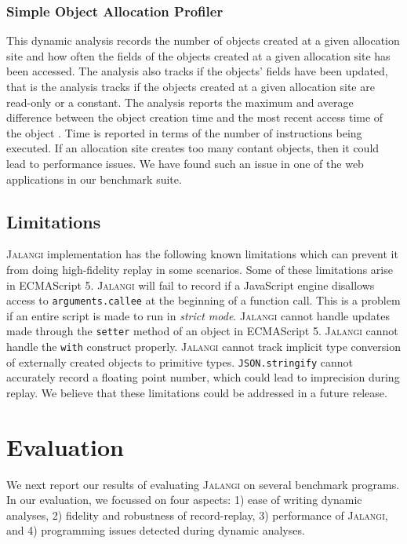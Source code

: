 \documentclass{sig-alternate}
\def\jalangi{\textsc{Jalangi}}
\begin{document}
\subsubsection*{Simple Object Allocation Profiler}
\label{sec:simple-object-alloc}

This dynamic analysis records the number of objects created at a given
allocation site and how often the fields of the objects created at a
given allocation site has been accessed.  The analysis also tracks if
the objects' fields have been updated, that is the analysis tracks if
the objects created at a given allocation site are read-only or a
constant.  The analysis reports the maximum and average difference
between the object creation time and the most recent access time of
the object .  Time is reported in terms of the number of instructions
being executed.  If an allocation site creates too many contant
objects, then it could lead to performance issues.  We have found such
an issue in one of the web applications in our benchmark suite.

\subsection*{Limitations}
\label{sec:limitations}

\jalangi{} implementation has the following known limitations which
can prevent it from doing high-fidelity replay in some scenarios.
Some of these limitations arise in ECMAScript 5.  \jalangi{} will fail
to record if a JavaScript engine disallows access to
\texttt{arguments.callee} at the beginning of a function call.  This
is a problem if an entire script is made to run in \emph{strict mode}.
\jalangi{} cannot handle updates made through the \texttt{setter}
method of an object in ECMAScript 5.  \jalangi{} cannot handle the
\texttt{with} construct properly.  \jalangi{} cannot track implicit
type conversion of externally created objects to primitive types.
\texttt{JSON.stringify} cannot accurately record a floating point
number, which could lead to imprecision during replay.  We believe
that these limitations could be addressed in a future release.


\section{Evaluation}
\label{sec:evaluation}

We next report our results of evaluating \jalangi{} on several
benchmark programs.  In our evaluation, we focussed on four aspects:
1) ease of writing dynamic analyses, 2) fidelity and robustness of
record-replay, 3) performance of \jalangi{}, and 4) programming issues
detected during dynamic analyses.
\end{document}
